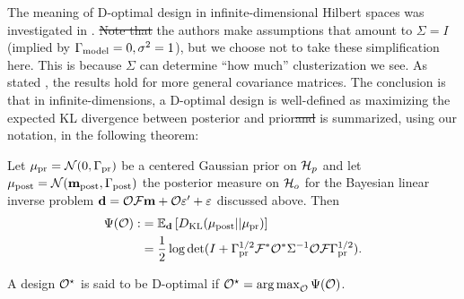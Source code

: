 \documentclass{amsart}
\numberwithin{equation}{section}
\providecommand{\DIFadd}[1]{{\protect\color{blue}\uwave{#1}}} %
\providecommand{\DIFdel}[1]{{\protect\color{red}\sout{#1}}}                      %
\providecommand{\DIFaddbegin}{} %
\providecommand{\DIFaddend}{} %
\providecommand{\DIFdelbegin}{} %
\providecommand{\DIFdelend}{} %
\begin{document}
\DIFaddend The meaning of D-optimal design in infinite-dimensional Hilbert spaces
was investigated in \cite{AlexanderianGloorGhattas14}. \DIFdelbegin \DIFdel{Note that }\DIFdelend \DIFaddbegin \DIFadd{There, }\DIFaddend the
authors make assumptions that amount to $\Sigma=I$ (implied by
$\Gamma_{\textup{model}} = 0,\sigma^2=1$), but we choose not to take these
simplification here. This is because $\Sigma$ can determine ``how
much'' clusterization we see. As stated
\cite[pp. 681]{AlexanderianGloorGhattas14}, the results hold for more
general covariance matrices. The conclusion is that in
infinite-dimensions, a D-optimal design is well-defined as maximizing
the expected KL divergence between posterior and prior\DIFdelbegin \DIFdel{and }\DIFdelend \DIFaddbegin \DIFadd{. The main
result }\DIFaddend is summarized, using our notation, in the following theorem:
\DIFdelbegin %
\DIFdelend \DIFaddbegin \begin{theorem}
  Let $\mu_{\textup{pr}} = \mathcal{N}(0,\Gamma_{\textup{pr}})$ be a centered Gaussian prior
  on $\mathcal{H}_p$   and let $\mu_{\textup{post}} = \mathcal{N}(\mathbf{m}_{\textup{post}},\Gamma_{\textup{post}})$ 
  the posterior measure on $\mathcal{H}_o$ for the Bayesian linear
  inverse problem $\mathbf{d} =  \mathcal{O} \mathcal{F}\mathbf{m} + \mathcal{O} \varepsilon' + \varepsilon$ discussed
  above. Then 
  \begin{align}\label{eq:objective}
    \begin{split}
      \Psi( \mathcal{O}) :&= \mathbb{E}_{\mathbf{d}}\left [ D_{\text{KL}} (\mu_{\textup{post}} || \mu_{\textup{pr}} ) \right ] \\
      &= \frac12 \log \det 
      ( I + \Gamma_{\textup{pr}}^{1/2}  \mathcal{F} ^* \mathcal{O}^* \Sigma^{-1} \mathcal{O} \mathcal{F} \Gamma_{\textup{pr}}^{1/2}).
    \end{split}
  \end{align}
\end{theorem}
\begin{definition}\label{def:d optimality}
  A design $\mathcal{O}^{\star}$ is said to be D-optimal if $\mathcal{O}^{\star} = \operatorname*{arg\,max}_{\mathcal{O}} \Psi(\mathcal{O})$.
\end{definition}
\DIFaddend 
\end{document}
